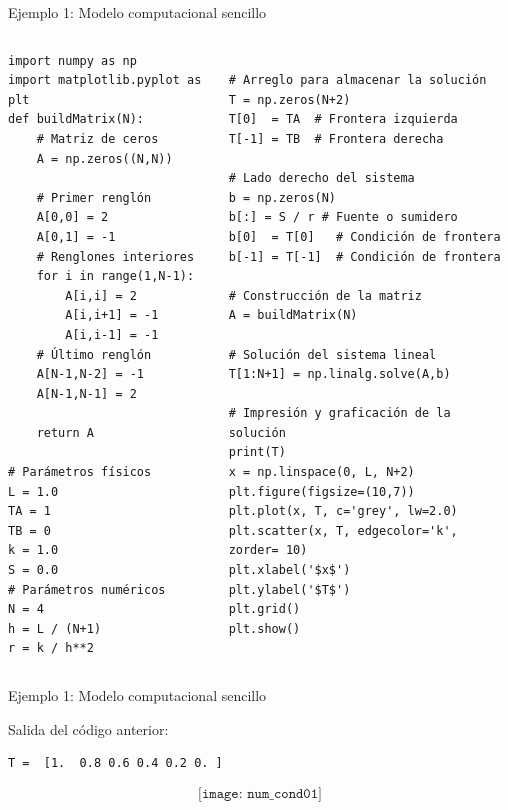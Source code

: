 \documentclass{beamer}
\begin{document}
\begin{frame}[fragile]{Ejemplo 1: Modelo computacional sencillo}

\begin{block}{}

\begin{columns}[t]
\begin{column}{0.48\textwidth}
\begin{lstlisting}
import numpy as np
import matplotlib.pyplot as plt
def buildMatrix(N):
    # Matriz de ceros
    A = np.zeros((N,N))
	
    # Primer renglón
    A[0,0] = 2
    A[0,1] = -1
    # Renglones interiores
    for i in range(1,N-1):
        A[i,i] = 2
        A[i,i+1] = -1
        A[i,i-1] = -1
    # Último renglón
    A[N-1,N-2] = -1
    A[N-1,N-1] = 2
	
    return A

# Parámetros físicos
L = 1.0
TA = 1
TB = 0
k = 1.0
S = 0.0
# Parámetros numéricos
N = 4
h = L / (N+1)
r = k / h**2
\end{lstlisting}		
\end{column}
\begin{column}{0.48\textwidth}
\begin{lstlisting}

# Arreglo para almacenar la solución
T = np.zeros(N+2)
T[0]  = TA  # Frontera izquierda
T[-1] = TB  # Frontera derecha

# Lado derecho del sistema
b = np.zeros(N)
b[:] = S / r # Fuente o sumidero
b[0]  = T[0]   # Condición de frontera
b[-1] = T[-1]  # Condición de frontera

# Construcción de la matriz
A = buildMatrix(N)

# Solución del sistema lineal
T[1:N+1] = np.linalg.solve(A,b)

# Impresión y graficación de la solución
print(T)
x = np.linspace(0, L, N+2)
plt.figure(figsize=(10,7))
plt.plot(x, T, c='grey', lw=2.0)
plt.scatter(x, T, edgecolor='k', zorder= 10)
plt.xlabel('$x$')
plt.ylabel('$T$')
plt.grid()
plt.show()
\end{lstlisting}		
\end{column}
\end{columns}
\end{block}

\end{frame}

\begin{frame}[fragile]{Ejemplo 1: Modelo computacional sencillo}

\begin{block}{Salida del código anterior:}
\begin{verbatim}
T =  [1.  0.8 0.6 0.4 0.2 0. ]
\end{verbatim}
$$ \texttt{[image: num\_cond01]}$$
\end{block}
\end{frame}
\end{document}
